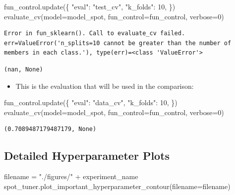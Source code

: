 \documentclass[
  letterpaper,
  DIV=11,
  numbers=noendperiod]{scrreprt}
\newenvironment{Shaded}{\begin{snugshade}}{\end{snugshade}}
\newcommand{\DecValTok}[1]{\textcolor[rgb]{0.68,0.00,0.00}{#1}}
\newcommand{\NormalTok}[1]{\textcolor[rgb]{0.00,0.23,0.31}{#1}}
\newcommand{\OperatorTok}[1]{\textcolor[rgb]{0.37,0.37,0.37}{#1}}
\newcommand{\StringTok}[1]{\textcolor[rgb]{0.13,0.47,0.30}{#1}}
\providecommand{\tightlist}{%
  \setlength{\itemsep}{0pt}\setlength{\parskip}{0pt}}\usepackage{longtable,booktabs,array}
\begin{document}
\begin{Shaded}
\begin{Highlighting}[]
\NormalTok{fun\_control.update(\{}
     \StringTok{"eval"}\NormalTok{: }\StringTok{"test\_cv"}\NormalTok{,}
     \StringTok{"k\_folds"}\NormalTok{: }\DecValTok{10}\NormalTok{,}
\NormalTok{\})}
\NormalTok{evaluate\_cv(model}\OperatorTok{=}\NormalTok{model\_spot, fun\_control}\OperatorTok{=}\NormalTok{fun\_control, verbose}\OperatorTok{=}\DecValTok{0}\NormalTok{)}
\end{Highlighting}
\end{Shaded}

\begin{verbatim}
Error in fun_sklearn(). Call to evaluate_cv failed. err=ValueError('n_splits=10 cannot be greater than the number of members in each class.'), type(err)=<class 'ValueError'>
\end{verbatim}

\begin{verbatim}
(nan, None)
\end{verbatim}

\begin{itemize}
\tightlist
\item
  This is the evaluation that will be used in the comparison:
\end{itemize}

\begin{Shaded}
\begin{Highlighting}[]
\NormalTok{fun\_control.update(\{}
     \StringTok{"eval"}\NormalTok{: }\StringTok{"data\_cv"}\NormalTok{,}
     \StringTok{"k\_folds"}\NormalTok{: }\DecValTok{10}\NormalTok{,}
\NormalTok{\})}
\NormalTok{evaluate\_cv(model}\OperatorTok{=}\NormalTok{model\_spot, fun\_control}\OperatorTok{=}\NormalTok{fun\_control, verbose}\OperatorTok{=}\DecValTok{0}\NormalTok{)}
\end{Highlighting}
\end{Shaded}

\begin{verbatim}
(0.7089487179487179, None)
\end{verbatim}

\hypertarget{detailed-hyperparameter-plots-4}{%
\subsection{Detailed Hyperparameter
Plots}\label{detailed-hyperparameter-plots-4}}

\begin{Shaded}
\begin{Highlighting}[]
\NormalTok{filename }\OperatorTok{=} \StringTok{"./figures/"} \OperatorTok{+}\NormalTok{ experiment\_name}
\NormalTok{spot\_tuner.plot\_important\_hyperparameter\_contour(filename}\OperatorTok{=}\NormalTok{filename)}
\end{Highlighting}
\end{Shaded}
\end{document}
